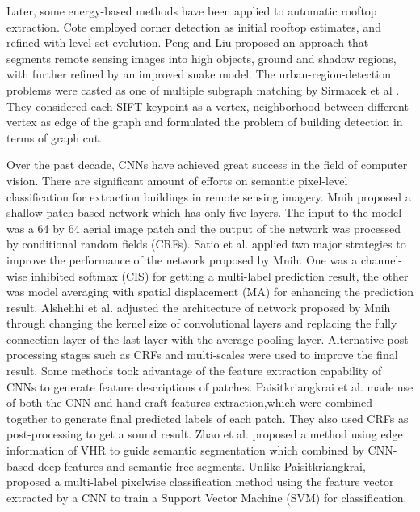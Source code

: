 \setlength{\parindent}{2ex}Later, some energy-based methods have been applied to automatic rooftop extraction. Cote \cite{IEEEexample:cote2013automatic} employed corner detection as initial rooftop estimates, and refined with level set evolution. Peng and Liu \cite{IEEEexample:peng2005improved} proposed an approach that segments remote sensing images into high objects, ground and shadow regions, with further refined by an improved snake model. The urban-region-detection problems were casted as one of multiple subgraph matching by Sirmacek et al \cite{IEEEexample:sirmacek2009urban}. They considered each SIFT keypoint as a vertex, neighborhood between different vertex as edge of the graph and formulated the problem of building detection in terms of graph cut.\par
\setlength{\parindent}{2ex}Over the past decade, CNNs have achieved great success in the field of computer vision. There are significant amount of efforts on semantic pixel-level classification for extraction buildings in remote sensing imagery. Mnih \cite{IEEEexample:mnih2013machine} proposed a shallow patch-based network which has only five layers. The input to the model was a 64 by 64 aerial image patch and the output of the network was processed by conditional random fields (CRFs). Satio et al.\cite{IEEEexample:saito2016multiple} applied two major strategies to improve the performance of the network proposed by Mnih. One was a channel-wise inhibited softmax (CIS) for getting a multi-label prediction result, the other was model averaging with spatial displacement (MA) for enhancing the prediction result. Alshehhi et al. \cite{IEEEexample:alshehhi2017simultaneous} adjusted the architecture of network proposed by Mnih through changing the kernel size of convolutional layers and replacing the fully connection layer of the last layer with the average pooling layer. Alternative post-processing stages such as CRFs and multi-scales were used to improve the final result. Some methods took advantage of the feature extraction capability of CNNs to generate feature descriptions of patches. Paisitkriangkrai et al. \cite{IEEEexample:paisitkriangkrai2015effective} made use of both the CNN and hand-craft features extraction,which were combined together to generate final predicted labels of each patch. They also used CRFs as post-processing to get a sound result. Zhao et al. \cite{IEEEexample:zhao2017contextually} proposed a method using edge information of VHR to guide semantic segmentation which combined by CNN-based deep features and semantic-free segments. Unlike Paisitkriangkrai, \cite{IEEEexample:he2017multi} proposed a multi-label pixelwise classification method using the feature vector extracted by a CNN to train a Support Vector Machine (SVM) for classification.\par
